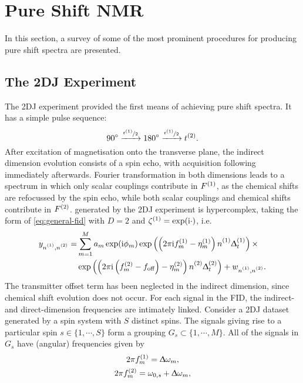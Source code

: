 \section{Pure Shift \acs{NMR}}

In this section, a survey of some of the most prominent procedures for
producing pure shift spectra are presented.

\subsection{The \acs{2DJ} Experiment}
The \ac{2DJ} experiment\cite{Aue1976, Morris2009} provided the first means of
achieving pure shift spectra. It has a simple pulse sequence:
\[
    \ang{90} \xrightarrow{\nicefrac{t^{(1)}}{2}} \ang{180} \xrightarrow{\nicefrac{t^{(1)}}{2}} t^{(2)}.
\]
After excitation of magnetisation onto the transverse plane, the indirect
dimension evolution consists of a spin echo, with acquisition following
immediately afterwards. Fourier transformation in both dimensions leads to a
spectrum in which only scalar couplings contribute in $F^{(1)}$, as the chemical
shifts are refocussed by the spin echo, while both scalar couplings and
chemical shifts contribute in $F^{(2)}$.   generated by the \ac{2DJ}
experiment is hypercomplex, taking the form of \cref{eq:general-fid} with
$D=2$ and $\zeta^{(1)} = \exp(\mathrm{i}\cdot)$, i.e.
\begin{equation}%
    \begin{split}%
        y_{\none,\ntwo} =
        &\sum_{m=1}^{M} a_m \exp(\iu \phi_m)
            \exp\left(\left(2 \pi \iu \fonem - \etaonem\right) \none \Dtone\right) \times \\
        &\exp\left(\left(2 \pi \iu  \left(\ftwom - \foff\right)
            - \etatwom\right) \ntwo \Dttwo\right)
            + w_{\none,\ntwo}.
    \end{split}%
    \label{eq:jres-fid}
\end{equation}%
The transmitter offset term has been neglected in the indirect dimension, since
chemical shift evolution does not occur.
For each signal in the \ac{FID}, the indirect- and direct-dimension
frequencies are intimately linked. Consider a \ac{2DJ} dataset generated by a
spin system with $S$ distinct spins. The signals giving rise to a particular
spin $s \in \lbrace 1, \cdots, S \rbrace$ form a grouping $G_s
\subset \lbrace 1, \cdots, M \rbrace$. All of the signals in $G_s$
have (angular) frequencies given by
\begin{subequations}
    \begin{gather}
        2 \pi f_m^{(1)} = \Updelta \omega_m,\\
        2 \pi f_m^{(2)} = \omega_{0,s} + \Updelta \omega_m,
    \end{gather}
    \label{eq:f1-f2-2dj}
\end{subequations}
